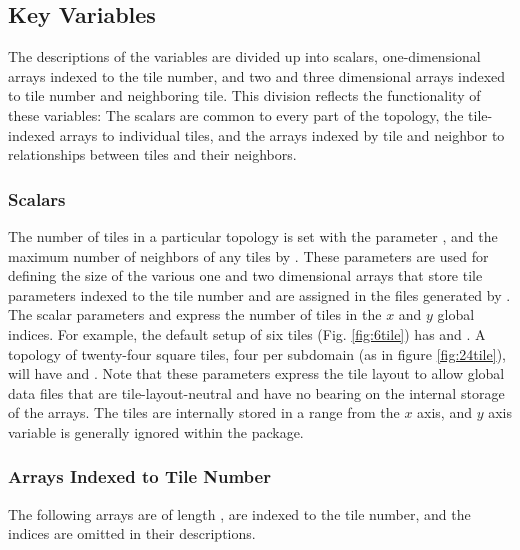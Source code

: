 \subsection{Key Variables}

The descriptions of the variables are divided up into scalars,
one-dimensional arrays indexed to the tile number, and two and three
dimensional arrays indexed to tile number and neighboring tile.  This
division reflects the functionality of these variables: The
scalars are common to every part of the topology, the tile-indexed
arrays to individual tiles, and the arrays indexed by tile and
neighbor to relationships between tiles and their neighbors. \\

\subsubsection{Scalars}

The number of tiles in a particular topology is set with the parameter
, and the maximum number of neighbors of any tiles by
.  These parameters are used for defining the
size of the various one and two dimensional arrays that store tile
parameters indexed to the tile number and are assigned in the files
generated by .\\

The scalar parameters 
and  express the number
of tiles in the $x$ and $y$ global indices.  For example, the default
setup of six tiles (Fig. \ref{fig:6tile}) has  and
.  A topology of twenty-four square tiles,
four per subdomain (as in figure \ref{fig:24tile}), will have
 and .  Note
that these parameters express the tile layout to allow global data
files that are tile-layout-neutral and have no bearing on the internal
storage of the arrays.  The tiles are internally stored in a range
from  the $x$ axis, and $y$ axis variable
 is generally ignored within the package. \\

\subsubsection{Arrays Indexed to Tile Number}

The following arrays are of length , are indexed to the
tile number, and the indices are omitted in their descriptions. \\

